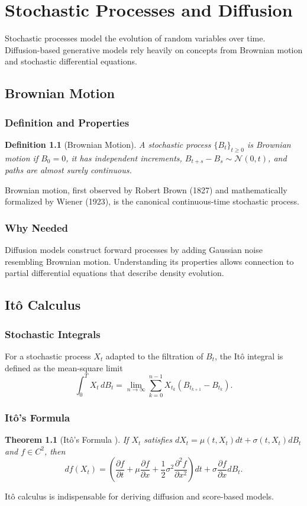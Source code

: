 \documentclass[11pt]{book}
\newtheorem{theorem}{Theorem}[chapter]
\newtheorem{definition}{Definition}[chapter]
\begin{document}
\chapter{Stochastic Processes and Diffusion}
Stochastic processes model the evolution of random variables over time. Diffusion-based generative models rely heavily on concepts from Brownian motion and stochastic differential equations.

\section{Brownian Motion}
\subsection{Definition and Properties}
\begin{definition}[Brownian Motion]
A stochastic process $\{B_t\}_{t\ge0}$ is Brownian motion if $B_0=0$, it has independent increments, $B_{t+s}-B_s\sim\mathcal{N}(0,t)$, and paths are almost surely continuous.
\end{definition}
Brownian motion, first observed by Robert Brown (1827) and mathematically formalized by Wiener (1923), is the canonical continuous-time stochastic process.

\subsection{Why Needed}
Diffusion models construct forward processes by adding Gaussian noise resembling Brownian motion. Understanding its properties allows connection to partial differential equations that describe density evolution.

\section{Itô Calculus}
\subsection{Stochastic Integrals}
For a stochastic process $X_t$ adapted to the filtration of $B_t$, the Itô integral is defined as the mean-square limit
\begin{equation}
\int_0^T X_t \, dB_t = \lim_{n\to\infty} \sum_{k=0}^{n-1} X_{t_k} (B_{t_{k+1}}-B_{t_k}).
\end{equation}

\subsection{Itô's Formula}
\begin{theorem}[Itô's Formula \cite{ito1944}]
If $X_t$ satisfies $dX_t=\mu(t,X_t)dt+\sigma(t,X_t)dB_t$ and $f\in C^{2}$, then
\begin{equation}
df(X_t) = \left(\frac{\partial f}{\partial t}+\mu\frac{\partial f}{\partial x}+\frac{1}{2}\sigma^2\frac{\partial^2 f}{\partial x^2}\right)dt + \sigma\frac{\partial f}{\partial x} dB_t.
\end{equation}
\end{theorem}
Itô calculus is indispensable for deriving diffusion and score-based models.
\end{document}
